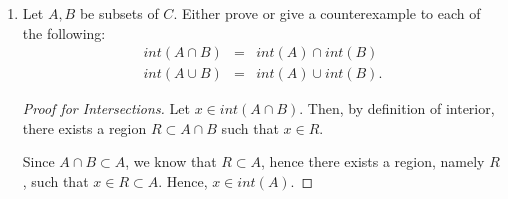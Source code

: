 \documentclass[11pt]{article}
\renewcommand{\emptyset}{\O}
\renewcommand{\_}[1]{\underline{ #1 }}
\DeclareMathOperator{\ext}{ext}
\theoremstyle{definition}
\numberwithin{equation}{subsection}
\begin{document}
\begin{enumerate}
\begin{enumerate}
\begin{proof}
Second, we want to show that if $A$ is open, then $A = int(A)$. If $A$ is open, we know that for all $a \in A$, there exists a region $S_a \subset A$ such that $a \in S_a$. Since $S_a \subset A$, we know that for any $s \in S_a, s \notin \ext(\_{ab}), s\neq a, s\neq b$. Hence, $A = int(A)$.

\renewcommand\qedsymbol{QED}
\end{proof}
\item Show that $int(A)$ is open.
\begin{proof}
Since $int(A)= C \setminus \{\ext(\_{ab}) \cup \{a\} \cup \{b\}\}$, it suffices to show that $\{\ext(\_{ab}) \cup \{a\} \cup \{b\}\}$ is closed.


Let $p \in LP(\ext(\_{ab}) \cup a \cup b)$, then we want to show that $p \in \{\ext(\_{ab}) \cup a \cup b\}$.

By commutativity of limit points over finite unions, we know that $p \in LP(\ext(\_{ab})) \cup LP(a) \cup LP(b)$. However, $LP(a)=LP(b)= \emptyset$, hence $p \in LP(\ext(\_{ab}))$. 

If $LP(\ext(\_{ab})) = \emptyset$, then $\{\ext(\_{ab}) \cup a \cup b\}$ is closed, and we are done. Else, we know that $\ext(\_{ab})$ is open, hence $p \notin \ext(\_{ab})$. 

Assume $p \in \_{ab}$. Then, there exists a region $R$, namely $R = \_{ab}$ such that $R \cap (\ext(\_{ab}) \cup a \cup b) = \emptyset$. This is a contradiction. Hence, $p \in \{a,b\}$. Therefore, $LP(\ext(\_{ab}) \cup a \cup b) \subset \{a,b\} \subset \{\ext(\_{ab}) \cup a \cup b\}$, hence $\{\ext(\_{ab}) \cup a \cup b\}$ is closed.


\renewcommand\qedsymbol{QED}
\end{proof}
\end{enumerate}




\item Let $A,B$ be subsets of $C. $ Either prove or give a counterexample to each of the following:
\begin{eqnarray*}
int(A\cap B)& = & int (A)\cap int(B)\\
int(A\cup B) & = & int (A)\cup int(B).
\end{eqnarray*}
\begin{proof}[Proof for Intersections]
Let $x \in int(A \cap B).$ Then, by definition of interior, there exists a region $R \subset A \cap B$ such that $x \in R$.

Since $A \cap B \subset A$, we know that $R \subset A$, hence there exists a region, namely $R$, such that $x \in R \subset A$. Hence, $x \in int(A)$.


\end{proof}
\end{enumerate}
\end{document}
